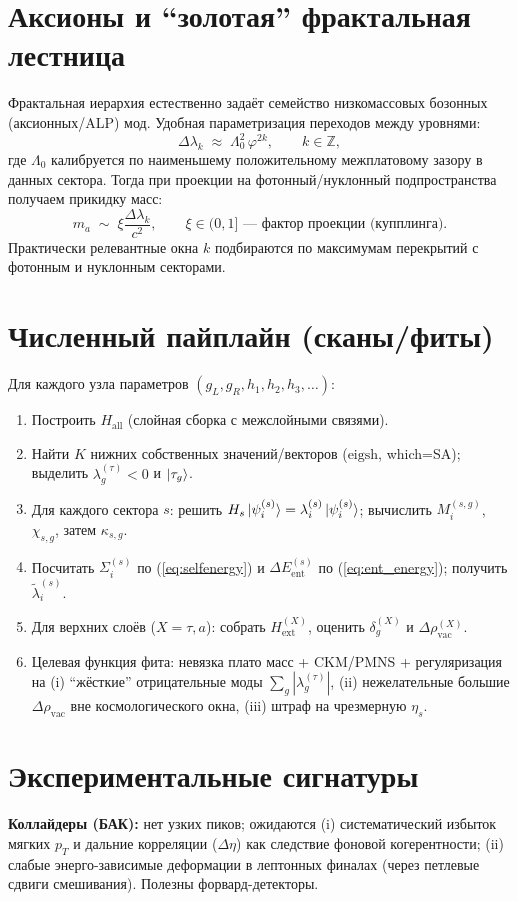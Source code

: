 \documentclass[12pt,a4paper]{article}
\begin{document}
\section{Аксионы и ``золотая'' фрактальная лестница}
Фрактальная иерархия естественно задаёт семейство низкомассовых бозонных (аксионных/ALP) мод. Удобная параметризация переходов между уровнями:
\[
\Delta\lambda_k \;\approx\; \Lambda_0^2\,\varphi^{2k},\qquad k\in\mathbb{Z},
\]
где $\Lambda_0$ калибруется по наименьшему положительному межплатовому зазору в данных сектора. Тогда при проекции на фотонный/нуклонный подпространства получаем прикидку масс:
\[
m_a \;\sim\; \xi \frac{\Delta\lambda_k}{c^2},\qquad
\xi\in(0,1] \text{ --- фактор проекции (купплинга)}.
\]
Практически релевантные окна $k$ подбираются по максимумам перекрытий с фотонным и нуклонным секторами.

\section{Численный пайплайн (сканы/фиты)}
Для каждого узла параметров $(g_L,g_R,h_1,h_2,h_3,\dots)$:
\begin{enumerate}
  \item Построить $H_{\text{all}}$ (слойная сборка с межслойными связями).
  \item Найти $K$ нижних собственных значений/векторов ($\mathrm{eigsh}$, which=SA); выделить $\lambda^{(\tau)}_g<0$ и $\ket{\tau_g}$.
  \item Для каждого сектора $s$: решить $H_s\ket{\psi^{(s)}_i}=\lambda^{(s)}_i\ket{\psi^{(s)}_i}$; вычислить $M^{(s,g)}_i$, $\chi_{s,g}$, затем $\kappa_{s,g}$.
  \item Посчитать $\Sigma^{(s)}_i$ по (\ref{eq:selfenergy}) и $\Delta E^{(s)}_{\text{ent}}$ по (\ref{eq:ent_energy}); получить $\tilde{\lambda}^{(s)}_i$.
  \item Для верхних слоёв ($X=\tau,a$): собрать $H_{\text{ext}}^{(X)}$, оценить $\delta^{(X)}_g$ и $\Delta\rho_{\text{vac}}^{(X)}$.
  \item Целевая функция фита: невязка плато масс + CKM/PMNS + регуляризация на (i) ``жёсткие'' отрицательные моды $\sum_g |\lambda^{(\tau)}_g|$, (ii) нежелательные большие $\Delta\rho_{\text{vac}}$ вне космологического окна, (iii) штраф на чрезмерную $\eta_s$.
\end{enumerate}

\section{Экспериментальные сигнатуры}
\textbf{Коллайдеры (БАК):} нет узких пиков; ожидаются (i) систематический избыток мягких $p_T$ и дальние корреляции ($\Delta\eta$) как следствие фоновой когерентности; (ii) слабые энерго-зависимые деформации в лептонных финалах (через петлевые сдвиги смешивания). Полезны форвард-детекторы.
\end{document}
